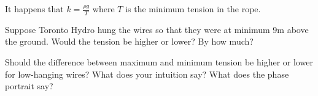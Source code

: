 \documentclass{workbook}
\begin{document}
\begin{slide}
\begin{parts}
	
	\item It happens that $k=\frac{\rho g}{T}$ where $T$ is the minimum tension in the rope.

	Suppose Toronto Hydro hung the wires so that they were at minimum 9m above the ground.
	Would the tension be higher or lower? By how much?

	\item Should the difference between maximum and minimum tension
	be higher or lower for low-hanging wires? What does your intuition say? What does the phase portrait say?

	
	
	

	
\end{parts}


	
\end{slide}
\end{document}
